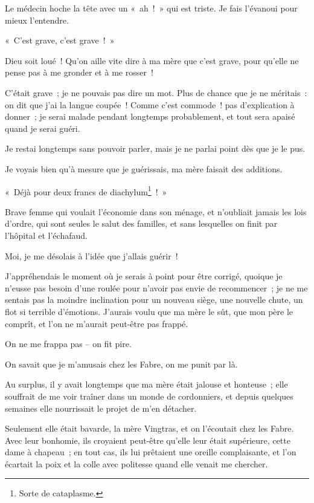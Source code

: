 \documentclass[french,twoside]{book} %
\begin{document}
Le médecin hoche la tête avec un « ah ! » qui est triste. Je fais l’évanoui pour mieux l’entendre.\par
« C’est grave, c’est grave ! »\par
Dieu soit loué ! Qu’on aille vite dire à ma mère que c’est grave, pour qu’elle ne pense pas à me gronder et à me rosser !\par
C’était grave ; je ne pouvais pas dire un mot. Plus de chance que je ne méritais : on dit que j’ai la langue coupée ! Comme c’est commode ! pas d’explication à donner ; je serai malade pendant longtemps probablement, et tout sera apaisé quand je serai guéri.\par
\bigbreak
\noindent Je restai longtemps sans pouvoir parler, mais je ne parlai point dès que je le pus.\par
Je voyais bien qu’à mesure que je guérissais, ma mère faisait des additions.\par
« Déjà pour deux francs de diachylum\footnote{Sorte de cataplasme.} ! »\par
Brave femme qui voulait l’économie dans son ménage, et n’oubliait jamais les lois d’ordre, qui sont seules le salut des familles, et sans lesquelles on finit par l’hôpital et l’échafaud.\par
Moi, je me désolais à l’idée que j’allais guérir !\par
J’appréhendais le moment où je serais à point pour être corrigé, quoique je n’eusse pas besoin d’une roulée pour n’avoir pas envie de recommencer ; je ne me sentais pas la moindre inclination pour un nouveau siège, une nouvelle chute, un flot si terrible d’émotions. J’aurais voulu que ma mère le sût, que mon père le comprît, et l’on ne m’aurait peut-être pas frappé.\par
On ne me frappa pas – on fit pire.\par
On savait que je m’amusais chez les Fabre, on me punit par là.\par
\bigbreak
\noindent Au surplus, il y avait longtemps que ma mère était jalouse et honteuse ; elle souffrait de me voir traîner dans un monde de cordonniers, et depuis quelques semaines elle nourrissait le projet de m’en détacher.\par
Seulement elle était bavarde, la mère Vingtras, et on l’écoutait chez les Fabre. Avec leur bonhomie, ils croyaient peut-être qu’elle leur était supérieure, cette dame à chapeau ; en tout cas, ils lui prêtaient une oreille complaisante, et l’on écartait la poix et la colle avec politesse quand elle venait me chercher.\par
\end{document}
